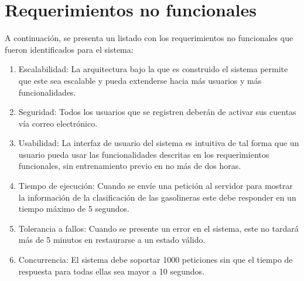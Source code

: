\section{Requerimientos no funcionales}\label{RequerimientosNF}
A continuación, se presenta un listado con los requerimientos no funcionales que fueron identificados para el sistema:
\begin{enumerate}[label=RNF\arabic*.]
	\item Escalabilidad: La arquitectura bajo la que es construido el sistema permite que este sea escalable y pueda extenderse hacia más usuarios y más funcionalidades.
	\item Seguridad: Todos los usuarios que se registren deberán de activar sus cuentas vía correo electrónico.
	\item Usabilidad: La interfaz de usuario del sistema es intuitiva de tal forma que un usuario pueda usar las funcionalidades descritas en los requerimientos funcionales, sin entrenamiento previo en no más de dos horas.
	\item Tiempo de ejecución: Cuando se envíe una petición al servidor para mostrar la información de la clasificación de las gasolineras este debe responder en un tiempo máximo de 5 segundos.
	\item Tolerancia a fallos: Cuando se presente un error en el sistema, este no tardará más de 5 minutos en restaurarse a un estado válido.
	\item Concurrencia: El sistema debe soportar 1000 peticiones sin que el tiempo de respuesta para todas ellas sea mayor a 10 segundos.
\end{enumerate}